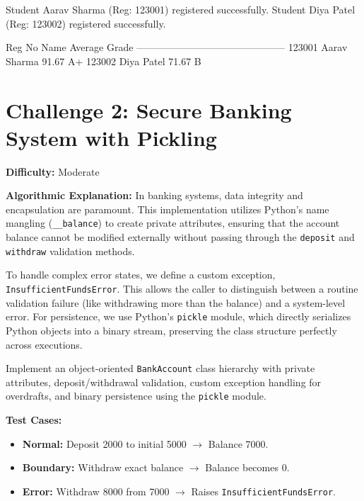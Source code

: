 \begin{outputbox}
Student Aarav Sharma (Reg: 123001) registered successfully.
Student Diya Patel (Reg: 123002) registered successfully.

Reg No     Name            Average    Grade 
---------------------------------------------
123001     Aarav Sharma    91.67      A+    
123002     Diya Patel      71.67      B     
\end{outputbox}

\section{Challenge 2: Secure Banking System with Pickling}

\textbf{Difficulty:} Moderate

\textbf{Algorithmic Explanation:}
In banking systems, data integrity and encapsulation are paramount. This implementation utilizes Python's name mangling (\texttt{\_\_balance}) to create private attributes, ensuring that the account balance cannot be modified externally without passing through the \texttt{deposit} and \texttt{withdraw} validation methods.

To handle complex error states, we define a custom exception, \texttt{InsufficientFundsError}. This allows the caller to distinguish between a routine validation failure (like withdrawing more than the balance) and a system-level error. For persistence, we use Python's \texttt{pickle} module, which directly serializes Python objects into a binary stream, preserving the class structure perfectly across executions.

\begin{practiceset}
Implement an object-oriented \texttt{BankAccount} class hierarchy with private attributes, deposit/withdrawal validation, custom exception handling for overdrafts, and binary persistence using the \texttt{pickle} module.

\textbf{Test Cases:}
\begin{itemize}
    \item \textbf{Normal:} Deposit 2000 to initial 5000 $\rightarrow$ Balance 7000.
    \item \textbf{Boundary:} Withdraw exact balance $\rightarrow$ Balance becomes 0.
    \item \textbf{Error:} Withdraw 8000 from 7000 $\rightarrow$ Raises \texttt{InsufficientFundsError}.
\end{itemize}
\end{practiceset}

